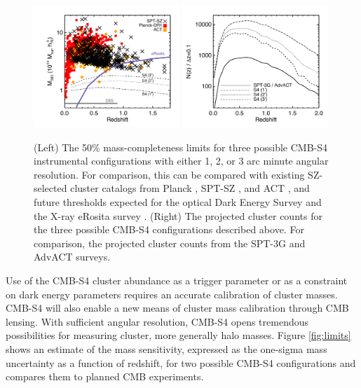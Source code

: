 \begin{figure}[t]
\begin{center}
\includegraphics[width=0.49\textwidth]{DarkEnergy/mass_vs_z_s4.pdf}
\includegraphics[width=0.49\textwidth]{DarkEnergy/dndz_s4.pdf}
\caption{(Left) The 50\% mass-completeness limits for three possible CMB-S4 instrumental configurations with either 1, 2, or 3 arc minute angular resolution.  For comparison, this can be compared with existing SZ-selected cluster catalogs from Planck \cite{Ade:2015mva}, SPT-SZ \cite{Bleem:2014iim}, and ACT \cite{Hasselfield:2013wf}, and future thresholds expected for the optical Dark Energy Survey and the X-ray eRosita survey \cite{Pillepich:2011zz}.  (Right) The projected cluster counts for the three possible CMB-S4 configurations described above.  For comparison, the projected cluster counts from the SPT-3G \cite{Benson:2014qhw} and AdvACT surveys.}
\label{fig:cluster_counts}
\end{center}
\end{figure} 

Use of the CMB-S4 cluster abundance as a trigger parameter or as a constraint on dark energy parameters requires an accurate
calibration of cluster masses. 
CMB-S4 will also enable a new means of  cluster mass calibration through CMB lensing.
With sufficient angular resolution, CMB-S4 opens tremendous possibilities for measuring cluster, more generally halo masses.    
  Figure \ref{fig:limits} shows an estimate of the mass sensitivity, expressed as the one-sigma mass uncertainty as a function of redshift, for two possible CMB-S4 configurations and compares them to planned CMB experiments. 


